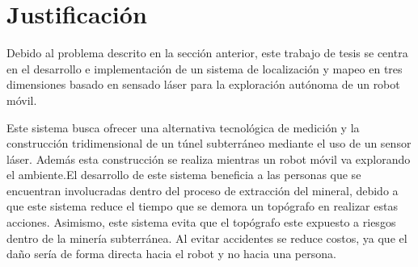 \section{Justificación}

Debido al problema descrito en la sección anterior, este trabajo de tesis se centra 
en el desarrollo e implementación de un sistema de localización y mapeo en tres 
dimensiones basado en sensado láser para la exploración autónoma de un robot móvil.

Este sistema busca ofrecer una alternativa tecnológica de medición y la construcción 
tridimensional de un túnel subterráneo mediante el uso de un sensor láser. Además esta
construcción se realiza mientras un robot móvil va explorando el ambiente.El 
desarrollo de este sistema beneficia a las personas que se encuentran involucradas 
dentro del proceso de extracción del mineral, debido a que este sistema reduce el tiempo 
que se demora un topógrafo en realizar estas acciones. Asimismo, este sistema evita que 
el topógrafo este expuesto a riesgos dentro de la minería subterránea. Al evitar accidentes
se reduce costos, ya que el daño sería de forma directa hacia el robot y no hacia una
persona.


